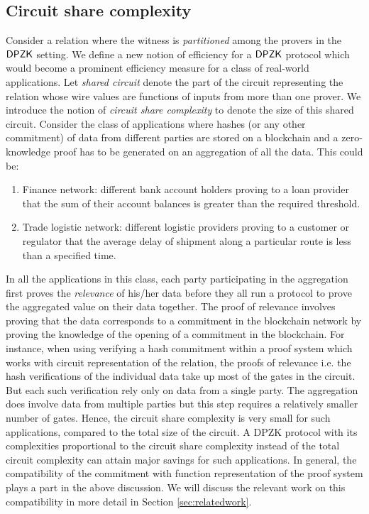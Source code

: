 \subsection{Circuit share complexity}
Consider a relation where the witness is \textit{partitioned} among the provers in the $\mathsf{DPZK}$ setting. We define a new notion of efficiency for a $\mathsf{DPZK}$ protocol which would become a prominent efficiency measure for a class of real-world applications.
Let \textit{shared circuit} denote the part of the circuit representing the relation whose wire values are functions of inputs from more than one prover. 
We introduce the notion of \textit{circuit share complexity} to denote the size of this shared circuit.
Consider the class of applications where hashes (or any other commitment) of data from different parties are stored on a blockchain and a zero-knowledge proof has to be generated on an aggregation of all the data. This could be: 
\begin{enumerate}
\item Finance network: different bank account holders proving to a loan provider that the sum of their account balances is greater than the required threshold.
\item Trade logistic network: different logistic providers proving to a customer or regulator that the average delay of shipment along a particular route is less than a specified time.
\end{enumerate}
In all the applications in this class, each party participating in the aggregation first proves the \textit{relevance} of his/her data before they all run a protocol to prove the aggregated value on their data together. The proof of relevance involves proving that the data corresponds to a commitment in the blockchain network by proving the knowledge of the opening of a commitment in the blockchain. 
For instance, when using verifying a hash commitment within a proof system which works with circuit representation of the relation, the proofs of relevance i.e. the hash verifications of the individual data take up most of the gates in the circuit. But each such verification rely only on data from a single party. The aggregation does involve data from multiple parties but this step requires a relatively smaller number of gates. Hence, the circuit share complexity is very small for such applications, compared to the total size of the circuit. A DPZK protocol with its complexities proportional to the circuit share complexity instead of the total circuit complexity can attain major savings for such applications.
In general, the compatibility of the commitment with function representation of the proof system plays a part in the above discussion. We will discuss the relevant work on this compatibility in more detail in Section \ref{sec:relatedwork}.

